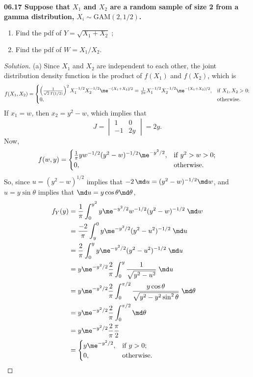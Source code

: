 \par{}
\vspace{1cm}

  \bf{06.17} Suppose that $X_1$ and $X_2$ are a random sample of size 2 from a gamma distribution, $X_i\sim\mathrm{GAM}(2,1/2)$.
    \begin{enumerate}
      \item
        Find the pdf of $Y=\sqrt{X_1+X_2}\;;$
      \item
        Find the pdf of $W={X_1}/{X_2}$.
    \end{enumerate}


\begin{proof}[Solution]
  (a) Since $X_1$ and $X_2$ are independent to each other,
  the joint distribution density function is the product of $f(X_1)$ and $f(X_2)$, which is
    $$
      f(X_1,X_2)=
        \begin{cases}
          \left(\frac{1}{\sqrt{2}\;\Gamma(1/2)}\right)^2X_1^{-1/2}X_2^{-1/2}\me^{-(X_1+X_2)\!/2}
          =\frac{1}{2\pi}X_1^{-1/2}X_2^{-1/2}\me^{-(X_1+X_2)/2}, & \mathrm{if}\;X_1,X_2>0; \\
          0, & \mathrm{otherwise}.
        \end{cases}
    $$
  If $x_1=w$, then $x_2=y^2-w$, which implies that
    $$
      J=
        \begin{vmatrix}
          1 & 0 \\
          -1 & 2y
        \end{vmatrix}
      =2y.
    $$
  Now,
    $$
      f(w,y)=
        \begin{cases}
          \frac{1}{\pi}yw^{-1/2}(y^2-w)^{-1/2}\me^{-y^2/2}, & \mathrm{if}\;y^2>w>0; \\
          0, & \mathrm{otherwise}.
        \end{cases}
    $$
  So, since $u=(y^2-w)^{1/2}$ implies that $-2\,\md u=(y^2-w)^{-1/2}\md w$, and $u=y\sin\theta$ implies that $\md u=y\cos\theta \md \theta$,
    \begin{align*}
      f_Y(y)&=\frac{1}{\pi}\int_0^{y^2}y\me^{-y^2/2}w^{-1/2}(y^2-w)^{-1/2}\;\md w \\
      &=\frac{-2}{\pi}\int_y^0y\me^{-y^2/2}(y^2-u^2)^{-1/2}\;\md u \\
      &=\frac{2}{\pi}\int_0^yy\me^{-y^2/2}(y^2-u^2)^{-1/2}\;\md u \\ &=y\me^{-y^2/2}\frac{2}{\pi}\int_0^y\frac{1}{\sqrt{y^2-u^2}}\;\md u\\
      &=y\me^{-y^2/2}\frac{2}{\pi}\int_0^{\pi/2}\frac{y\cos\theta}{\sqrt{y^2-y^2\sin^2\theta}}\;\md \theta\\
      &=y\me^{-y^2/2}\frac{2}{\pi}\int_0^{\pi/2}\md \theta\\
      &=y\me^{-y^2/2}\frac{2}{\pi}\frac{\pi}{2}\\
      &=\begin{cases}
         y\me^{-y^2/2}, & \mathrm{if}\;y>0; \\
          0, & \mathrm{otherwise}.
        \end{cases}
    \end{align*}


\end{proof}
